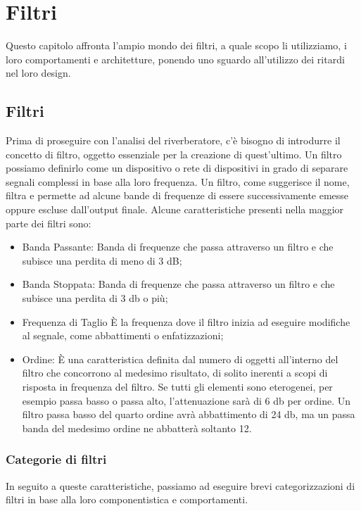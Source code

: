 
\chapter{Filtri}
\label{chp:Filtri}

Questo capitolo affronta l'ampio mondo dei filtri, a quale scopo li utilizziamo, i loro comportamenti e architetture, ponendo uno sguardo all'utilizzo dei ritardi nel loro design.

\section{Filtri}
Prima di proseguire con l’analisi del riverberatore, c’è bisogno di introdurre il concetto di filtro, oggetto essenziale  per la creazione di quest’ultimo.
Un filtro possiamo definirlo come un dispositivo o rete di dispositivi in grado di separare segnali complessi in base alla loro frequenza. Un filtro, come suggerisce il nome, filtra e permette ad alcune bande di frequenze di essere successivamente emesse oppure escluse dall’output finale. 
Alcune caratteristiche presenti nella maggior parte dei filtri sono:
\begin{itemize}
\item Banda Passante:
Banda di frequenze che passa attraverso un filtro e che subisce una perdita di meno di 3 dB;
\item Banda Stoppata:
Banda di frequenze che passa attraverso un filtro e che subisce una perdita di 3 db o più; 
\item Frequenza di Taglio
È la frequenza dove il filtro inizia ad eseguire modifiche al segnale, come abbattimenti o enfatizzazioni;
\item Ordine:
È una caratteristica definita dal numero di oggetti all’interno del filtro che concorrono al medesimo risultato, di solito inerenti a scopi di risposta in frequenza del filtro. Se tutti gli elementi sono eterogenei, per esempio passa basso o passa alto, l’attenuazione sarà di 6 db per ordine. Un filtro passa basso del quarto ordine avrà abbattimento di 24 db, ma un passa banda del medesimo ordine ne abbatterà soltanto 12.
\end{itemize}
\medskip
\subsection{Categorie di filtri}
In seguito a queste caratteristiche, passiamo ad eseguire brevi categorizzazioni di filtri in base alla loro componentistica e comportamenti.

